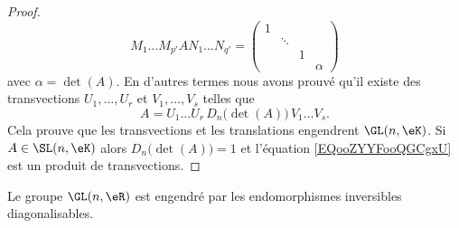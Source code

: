 \begin{proof}
	\begin{equation}
		M_1\ldots M_{p'}AN_1\ldots N_{q'}=
		\begin{pmatrix}
			1 &        &   &        \\
			  & \ddots &   &        \\
			  &        & 1 &        \\
			  &        &   & \alpha
		\end{pmatrix}
	\end{equation}
	avec \( \alpha=\det(A)\). En d'autres termes nous avons prouvé qu'il existe des transvections \( U_1,\ldots, U_r\) et \( V_1,\ldots, V_s\) telles que
	\begin{equation}        \label{EQooZYYFooQGCgxU}
		A=U_1\ldots U_r\,D_n\big( \det(A) \big)\,V_1\ldots V_s.
	\end{equation}
	Cela prouve que les transvections et les translations engendrent \( \GL(n,\eK)\). Si \( A\in \SL(n,\eK)\) alors \( D_n\big( \det(A) \big)=1\) et l'équation \eqref{EQooZYYFooQGCgxU} est un produit de transvections.
\end{proof}

\begin{proposition}
	Le groupe \( \GL(n,\eR)\) est engendré par les endomorphismes inversibles diagonalisables.
\end{proposition}


